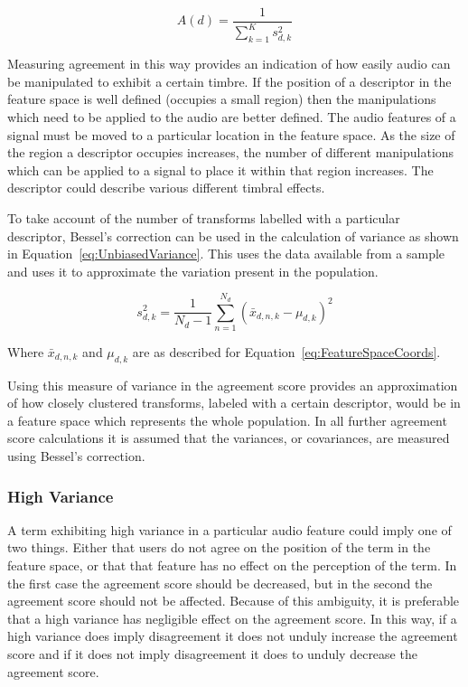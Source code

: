 			\begin{equation}
				A(d) = \frac{1}{\sum_{k = 1}^{K} s_{d,k}^{2}}
				\label{eq:ReciprocalOfSumAgreement}
			\end{equation}

			Measuring agreement in this way provides an indication of how easily audio can be manipulated to
			exhibit a certain timbre. If the position of a descriptor in the feature space is well defined
			(occupies a small region) then the manipulations which need to be applied to the audio are better
			defined. The audio features of a signal must be moved to a particular location in the feature
			space. As the size of the region a descriptor occupies increases, the number of different
			manipulations which can be applied to a signal to place it within that region increases. The
			descriptor could describe various different timbral effects.

			To take account of the number of transforms labelled with a particular descriptor, Bessel's
			correction can be used in the calculation of variance as shown in
			Equation~\ref{eq:UnbiasedVariance}. This uses the data available from a sample and uses it to
			approximate the variation present in the population.

			\begin{equation}
				s_{d,k}^{2} = \frac{1}{N_{d} - 1} \sum_{n = 1}^{N_{d}} (\bar{x}_{d,n,k} - \mu_{d,k})^{2}
				\label{eq:UnbiasedVariance}
			\end{equation}

			Where $\bar{x}_{d,n,k}$ and $\mu_{d,k}$ are as described for Equation~\ref{eq:FeatureSpaceCoords}.

			Using this measure of variance in the agreement score provides an approximation of how closely
			clustered transforms, labeled with a certain descriptor, would be in a feature space which
			represents the whole population. In all further agreement score calculations it is assumed that the
			variances, or covariances, are measured using Bessel's correction.

		\subsubsection*{High Variance}
			A term exhibiting high variance in a particular audio feature could imply one of two things. Either
			that users do not agree on the position of the term in the feature space, or that that feature has
			no effect on the perception of the term. In the first case the agreement score should be decreased,
			but in the second the agreement score should not be affected. Because of this ambiguity, it is
			preferable that a high variance has negligible effect on the agreement score. In this way, if a
			high variance does imply disagreement it does not unduly increase the agreement score and if it
			does not imply disagreement it does to unduly decrease the agreement score.
			

